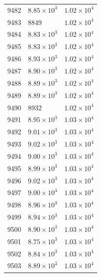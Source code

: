 \begin{table}[H]
\begin{tabular}{lll}
9482 & $\displaystyle 8.85 \times 10^{3}$ & $\displaystyle 1.02 \times 10^{4}$ \\
9483 & 8849 & $\displaystyle 1.02 \times 10^{4}$ \\
9484 & $\displaystyle 8.83 \times 10^{3}$ & $\displaystyle 1.02 \times 10^{4}$ \\
9485 & $\displaystyle 8.83 \times 10^{3}$ & $\displaystyle 1.02 \times 10^{4}$ \\
9486 & $\displaystyle 8.93 \times 10^{3}$ & $\displaystyle 1.02 \times 10^{4}$ \\
9487 & $\displaystyle 8.90 \times 10^{3}$ & $\displaystyle 1.02 \times 10^{4}$ \\
9488 & $\displaystyle 8.89 \times 10^{3}$ & $\displaystyle 1.02 \times 10^{4}$ \\
9489 & $\displaystyle 8.89 \times 10^{3}$ & $\displaystyle 1.02 \times 10^{4}$ \\
9490 & 8932 & $\displaystyle 1.02 \times 10^{4}$ \\
9491 & $\displaystyle 8.95 \times 10^{3}$ & $\displaystyle 1.03 \times 10^{4}$ \\
9492 & $\displaystyle 9.01 \times 10^{3}$ & $\displaystyle 1.03 \times 10^{4}$ \\
9493 & $\displaystyle 9.02 \times 10^{3}$ & $\displaystyle 1.03 \times 10^{4}$ \\
9494 & $\displaystyle 9.00 \times 10^{3}$ & $\displaystyle 1.03 \times 10^{4}$ \\
9495 & $\displaystyle 8.99 \times 10^{3}$ & $\displaystyle 1.03 \times 10^{4}$ \\
9496 & $\displaystyle 9.02 \times 10^{3}$ & $\displaystyle 1.03 \times 10^{4}$ \\
9497 & $\displaystyle 9.00 \times 10^{3}$ & $\displaystyle 1.03 \times 10^{4}$ \\
9498 & $\displaystyle 8.96 \times 10^{3}$ & $\displaystyle 1.03 \times 10^{4}$ \\
9499 & $\displaystyle 8.94 \times 10^{3}$ & $\displaystyle 1.03 \times 10^{4}$ \\
9500 & $\displaystyle 8.90 \times 10^{3}$ & $\displaystyle 1.03 \times 10^{4}$ \\
9501 & $\displaystyle 8.75 \times 10^{3}$ & $\displaystyle 1.03 \times 10^{4}$ \\
9502 & $\displaystyle 8.84 \times 10^{3}$ & $\displaystyle 1.03 \times 10^{4}$ \\
9503 & $\displaystyle 8.89 \times 10^{3}$ & $\displaystyle 1.03 \times 10^{4}$ \\

\end{tabular}
\end{table}
